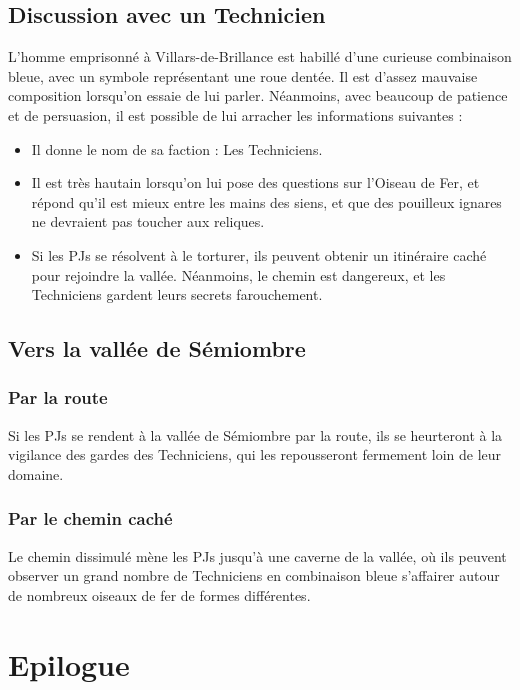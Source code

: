 \documentclass[10pt,twoside,twocolumn,openany,bg=print,justified]{dndbook}
\begin{document}
\subsection*{Discussion avec un Technicien}

L'homme emprisonné à Villars-de-Brillance est habillé d'une curieuse combinaison bleue, avec un symbole représentant une roue dentée. Il est d'assez mauvaise composition lorsqu'on essaie de lui parler. Néanmoins, avec beaucoup de patience et de persuasion, il est possible de lui arracher les informations suivantes :

\begin{itemize}
	\item Il donne le nom de sa faction : Les Techniciens.
	\item Il est très hautain lorsqu'on lui pose des questions sur l'Oiseau de Fer, et répond qu'il est mieux entre les mains des siens, et que des pouilleux ignares ne devraient pas toucher aux reliques.
	\item Si les PJs se résolvent à le torturer, ils peuvent obtenir un itinéraire caché pour rejoindre la vallée. Néanmoins, le chemin est dangereux, et les Techniciens gardent leurs secrets farouchement.
\end{itemize}

\subsection*{Vers la vallée de Sémiombre}

\subsubsection*{Par la route}

Si les PJs se rendent à la vallée de Sémiombre par la route, ils se heurteront à la vigilance des gardes des Techniciens, qui les repousseront fermement loin de leur domaine.

\subsubsection*{Par le chemin caché}

Le chemin dissimulé mène les PJs jusqu'à une caverne de la vallée, où ils peuvent observer un grand nombre de Techniciens en combinaison bleue s'affairer autour de nombreux oiseaux de fer de formes différentes.

\section{Epilogue}
\end{document}
